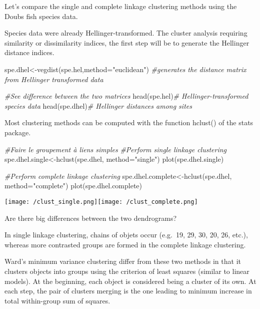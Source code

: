 \documentclass[
]{book}
\newenvironment{Shaded}{\begin{snugshade}}{\end{snugshade}}
\newcommand{\AttributeTok}[1]{\textcolor[rgb]{0.77,0.63,0.00}{#1}}
\newcommand{\CommentTok}[1]{\textcolor[rgb]{0.56,0.35,0.01}{\textit{#1}}}
\newcommand{\FunctionTok}[1]{\textcolor[rgb]{0.00,0.00,0.00}{#1}}
\newcommand{\NormalTok}[1]{#1}
\newcommand{\OtherTok}[1]{\textcolor[rgb]{0.56,0.35,0.01}{#1}}
\newcommand{\StringTok}[1]{\textcolor[rgb]{0.31,0.60,0.02}{#1}}
\begin{document}
Let's compare the single and complete linkage clustering methods using
the Doubs fish species data.

Species data were already Hellinger-transformed. The cluster analysis
requiring similarity or dissimilarity indices, the first step will be to
generate the Hellinger distance indices.

\begin{Shaded}
\begin{Highlighting}[]
\NormalTok{spe.dhel}\OtherTok{\textless{}{-}}\FunctionTok{vegdist}\NormalTok{(spe.hel,}\AttributeTok{method=}\StringTok{"euclidean"}\NormalTok{) }\CommentTok{\#generates the distance matrix from Hellinger transformed data}

\CommentTok{\#See difference between the two matrices}
\FunctionTok{head}\NormalTok{(spe.hel)}\CommentTok{\# Hellinger{-}transformed species data}
\FunctionTok{head}\NormalTok{(spe.dhel)}\CommentTok{\# Hellinger distances among sites}
\end{Highlighting}
\end{Shaded}

Most clustering methods can be computed with the function hclust() of
the stats package.

\begin{Shaded}
\begin{Highlighting}[]
\CommentTok{\#Faire le groupement à liens simples}
\CommentTok{\#Perform single linkage clustering}
\NormalTok{spe.dhel.single}\OtherTok{\textless{}{-}}\FunctionTok{hclust}\NormalTok{(spe.dhel, }\AttributeTok{method=}\StringTok{"single"}\NormalTok{)}
\FunctionTok{plot}\NormalTok{(spe.dhel.single)}

\CommentTok{\#Perform complete linkage clustering}
\NormalTok{spe.dhel.complete}\OtherTok{\textless{}{-}}\FunctionTok{hclust}\NormalTok{(spe.dhel, }\AttributeTok{method=}\StringTok{"complete"}\NormalTok{)}
\FunctionTok{plot}\NormalTok{(spe.dhel.complete)}
\end{Highlighting}
\end{Shaded}

\texttt{[image: /clust\_single.png]}\texttt{[image: /clust\_complete.png]}

Are there big differences between the two dendrograms?

In single linkage clustering, chains of objets occur (e.g.~19, 29, 30,
20, 26, etc.), whereas more contrasted groups are formed in the complete
linkage clustering.

Ward's minimum variance clustering differ from these two methods in that
it clusters objects into groups using the criterion of least squares
(similar to linear models). At the beginning, each object is considered
being a cluster of its own. At each step, the pair of clusters merging
is the one leading to minimum increase in total within-group sum of
squares.
\end{document}
